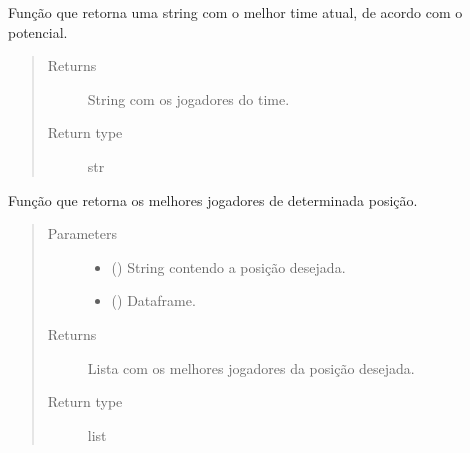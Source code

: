 \documentclass[letterpaper,10pt,brazil]{sphinxmanual}
\begin{document}

\begin{fulllineitems}
\label{\detokenize{solucao_fifa:solucao_fifa.melhor_time_futuro}}
Função que retorna uma string com o melhor time atual, de acordo com o potencial.
\begin{quote}\begin{description}
\item[{Returns}] \leavevmode
String com os jogadores do time.

\item[{Return type}] \leavevmode
str

\end{description}\end{quote}

\end{fulllineitems}


\begin{fulllineitems}
\label{\detokenize{solucao_fifa:solucao_fifa.melhores}}
Função que retorna os melhores jogadores de determinada posição.
\begin{quote}\begin{description}
\item[{Parameters}] \leavevmode\begin{itemize}
\item {} 
 () \textendash{} String contendo a posição desejada.

\item {} 
 () \textendash{} Dataframe.

\end{itemize}

\item[{Returns}] \leavevmode
Lista com os melhores jogadores da posição desejada.

\item[{Return type}] \leavevmode
list

\end{description}\end{quote}

\end{fulllineitems}
\end{document}
